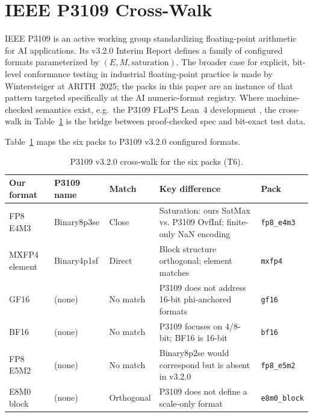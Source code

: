 \documentclass[11pt,letterpaper]{article}
\begin{document}
\section{IEEE P3109 Cross-Walk}
\label{sec:p3109}

IEEE P3109 \cite{p3109_interim} is an active working group standardizing
floating-point arithmetic for AI applications.  Its v3.2.0 Interim Report
defines a family of configured formats parameterized by $(E, M, \text{saturation})$.
The broader case for explicit, bit-level conformance testing in industrial
floating-point practice is made by Wintersteiger \cite{wintersteiger_arith2025}
at ARITH~2025; the packs in this paper are an instance of that pattern targeted
specifically at the AI numeric-format registry.  Where machine-checked
semantics exist, e.g.\ the P3109 FLoPS Lean~4 development \cite{flops_lean},
the cross-walk in Table~\ref{tab:p3109} is the bridge between proof-checked
spec and bit-exact test data.

Table~\ref{tab:p3109} maps the six packs to P3109 v3.2.0 configured formats.

\begin{table}[ht]
\centering
\small
\caption{P3109 v3.2.0 cross-walk for the six packs (T6).}
\label{tab:p3109}
\begin{tabularx}{\linewidth}{l l l X l}
\toprule
\textbf{Our format} & \textbf{P3109 name} & \textbf{Match} & \textbf{Key difference} & \textbf{Pack} \\
\midrule
FP8 E4M3      & Binary8p3se & Close      & Saturation: ours SatMax vs. P3109 OvfInf; finite-only NaN encoding & \texttt{fp8\_e4m3} \\
MXFP4 element & Binary4p1sf & Direct     & Block structure orthogonal; element matches                        & \texttt{mxfp4} \\
GF16          & (none)      & No match   & P3109 does not address 16-bit phi-anchored formats                 & \texttt{gf16} \\
BF16          & (none)      & No match   & P3109 focuses on 4/8-bit; BF16 is 16-bit                           & \texttt{bf16} \\
FP8 E5M2      & (none)      & No match   & Binary8p2se would correspond but is absent in v3.2.0               & \texttt{fp8\_e5m2} \\
E8M0 block    & (none)      & Orthogonal & P3109 does not define a scale-only format                          & \texttt{e8m0\_block} \\
\bottomrule
\end{tabularx}
\end{table}
\end{document}
